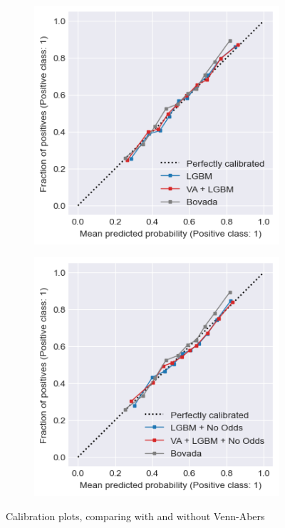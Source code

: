 \documentclass[12pt,twoside]{report}
\begin{document}
\begin{figure}[htb]
\begin{subfigure}{.5\linewidth}
\end{subfigure}
\begin{subfigure}{.5\linewidth}
  \centering
  \includegraphics[width=0.9\linewidth]{figures/calib_lightgbm_and_va.png}
\end{subfigure}%
\begin{subfigure}{.5\linewidth}
  \centering
  \includegraphics[width=0.9\linewidth]{figures/calib_lightgbm_no_odds_and_va.png}
\end{subfigure}
\caption{Calibration plots, comparing with and without Venn-Abers}
\end{figure}
\end{document}
